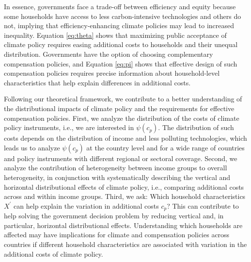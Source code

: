 \documentclass[12pt, a4paper]{article}
\begin{document}
In essence, governments face a trade-off between efficiency and equity \autocite{Hansel.2022,TerryDinan.2016,Drupp.2024} because some households have access to less carbon-intensive technologies and others do not, implying that efficiency-enhancing climate policies may lead to increased inequality. Equation \ref{eq:theta} shows that maximizing public acceptance of climate policy requires easing additional costs to households and their unequal distribution. Governments have the option of choosing complementary compensation policies, and Equation \ref{eq:pi} shows that effective design of such compensation policies requires precise information about household-level characteristics that help explain differences in additional costs. 

Following our theoretical framework, we contribute to a better understanding of the distributional impacts of climate policy and the requirements for effective compensation policies. First, we analyze the distribution of the costs of climate policy instruments, i.e., we are interested in $\psi(c_{p})$. The distribution of such costs depends on the distribution of income and less polluting technologies, which leads us to analyze $\psi(c_{p})$ at the country level and for a wide range of countries and policy instruments with different regional or sectoral coverage. Second, we analyze the contribution of heterogeneity between income groups to overall heterogeneity, in conjunction with systematically describing the vertical and horizontal distributional effects of climate policy, i.e., comparing additional costs across and within income groups. Third, we ask: Which household characteristics $X^{\prime}$ can help explain the variation in additional costs $c_{p}$? This can contribute to help solving the government decision problem by reducing vertical and, in particular, horizontal distributional effects. Understanding which households are affected  may have implications for climate and compensation policies across countries if different household characteristics are associated with variation in the additional costs of climate policy.    

\end{document}
